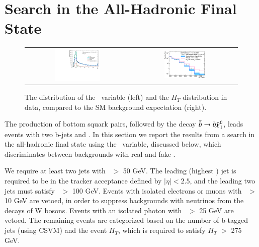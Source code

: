 \section{Search in the All-Hadronic Final State}
\label{sec:alphat}

\begin{figure}[!ht]
\centering
\begin{tabular}{cc}
\includegraphics[width=0.45\textwidth]{HCPPlots/AlphaT_le3j_prelim.pdf} &
\includegraphics[width=0.4\textwidth]{HCPPlots/hadronic_2b_le3j_logy.pdf} \\
\end{tabular}
\caption{
The distribution of the \alphat\ variable (left) and the $H_T$ distribution in data, compared to the SM background expectation (right).
\label{fig:alphat}
}
\end{figure}

The production of bottom squark pairs, followed by the decay $\tilde{b}\to b\tilde{\chi}_{1}^{0}$, leads events with
two b-jets and \met. In this section we report the results from a search in the all-hadronic final state using the 
\alphat\ variable, discussed below, which discriminates between backgrounds with real and fake \met.

We require at least two jets with \pt\ $>$ 50 GeV. The leading (highest \pt) jet is required to be in the tracker 
acceptance defined by $|\eta|<2.5$, and the leading two jets must satisfy \pt\ $>$ 100 GeV. Events with isolated 
electrons or muons with \pt\ $>$ 10 GeV are vetoed, in order to suppress backgrounds with neutrinos from the decays 
of W bosons. Events with an isolated photon with \pt\ $>$ 25 GeV are vetoed.
The remaining events are categorized based on the number of b-tagged jets (using CSVM) and the event $H_T$, 
which is required to satisfy $H_T$ $>$ 275 GeV.

